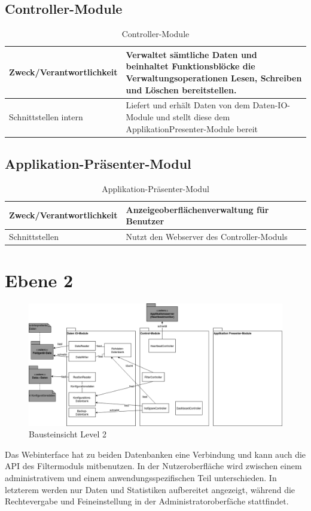 \subsection{Controller-Module}
\begin{table}[th]
	\begin{tabularx}{\textwidth}{p{5cm} X}
		\hline
		Zweck/Verantwortlichkeit & Verwaltet sämtliche Daten und beinhaltet Funktionsblöcke die Verwaltungsoperationen Lesen, Schreiben und Löschen bereitstellen. \\
		\hline
		Schnittstellen intern & Liefert und erhält Daten von dem Daten-IO-Module und stellt diese dem ApplikationPresenter-Module bereit\\
		\hline
	\end{tabularx} 
	\caption{Controller-Module}
	\label{Controller-Module}
\end{table}

\subsection{Applikation-Präsenter-Modul}
\begin{table}[th]
	\begin{tabularx}{\textwidth}{p{5cm} X}
		\hline
		Zweck/Verantwortlichkeit & Anzeigeoberflächenverwaltung für Benutzer \\
		\hline
		Schnittstellen & Nutzt den Webserver des Controller-Moduls\\
		\hline
	\end{tabularx} 
	\caption{Applikation-Präsenter-Modul}
	\label{tab:Applikation-Präsenter-Modul}
\end{table}
\clearpage
\section{Ebene 2}
\begin{figure}[h]
	\centering
	\includegraphics[width=1\textwidth]{Graphics/bausteinansicht_ebene_2.png}
	\caption{Bausteinsicht Level 2}
	\label{fig:bausteinsichtlvl2}
\end{figure}
Das Webinterface hat zu beiden Datenbanken eine Verbindung und kann auch die API des Filtermoduls mitbenutzen. In der Nutzeroberfläche wird zwischen einem administrativem und einem anwendungsspezifischen Teil unterschieden. In letzterem werden nur Daten und Statistiken aufbereitet angezeigt, während die Rechtevergabe und Feineinstellung in der Administratoroberfäche stattfindet. 

